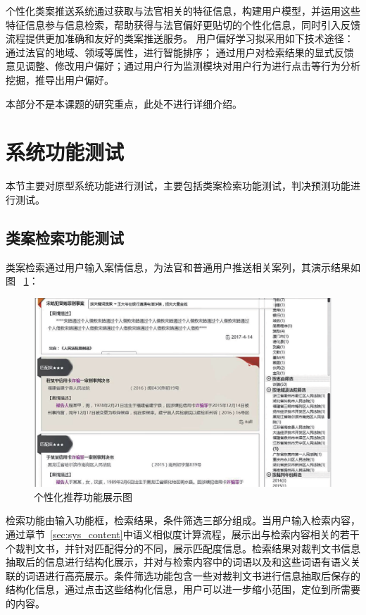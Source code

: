 个性化类案推送系统通过获取与法官相关的特征信息，构建用户模型，并运用这些特征信息参与信息检索，帮助获得与法官偏好更贴切的个性化信息，同时引入反馈流程提供更加准确和友好的类案推送服务。 用户偏好学习拟采用如下技术途径： 通过法官的地域、领域等属性，进行智能排序； 通过用户对检索结果的显式反馈意见调整、修改用户偏好；通过用户行为监测模块对用户行为进行点击等行为分析挖掘，推导出用户偏好。

本部分不是本课题的研究重点，此处不进行详细介绍。



\section{系统功能测试}
本节主要对原型系统功能进行测试，主要包括类案检索功能测试，判决预测功能进行测试。
\subsection{类案检索功能测试}
类案检索通过用户输入案情信息，为法官和普通用户推送相关案列，其演示结果如图
~\ref{fig:sys_search}：
\begin{figure}[htbp]%
    \centering
    \includegraphics[scale=0.35, clip=true]{./sources/sys_search.eps}
    \caption{\label{fig:sys_search}个性化推荐功能展示图}
\end{figure}

检索功能由输入功能框，检索结果，条件筛选三部分组成。当用户输入检索内容，通过章节~\ref{sec:sys_content}中语义相似度计算流程，展示出与检索内容相关的若干个裁判文书，并针对匹配得分的不同，展示匹配度信息。检索结果对裁判文书信息抽取后的信息进行结构化展示，并对与检索内容中的词语以及和这些词语有语义关联的词语进行高亮展示。条件筛选功能包含一些对裁判文书进行信息抽取后保存的结构化信息，通过点击这些结构化信息，用户可以进一步缩小范围，定位到所需要的内容。

